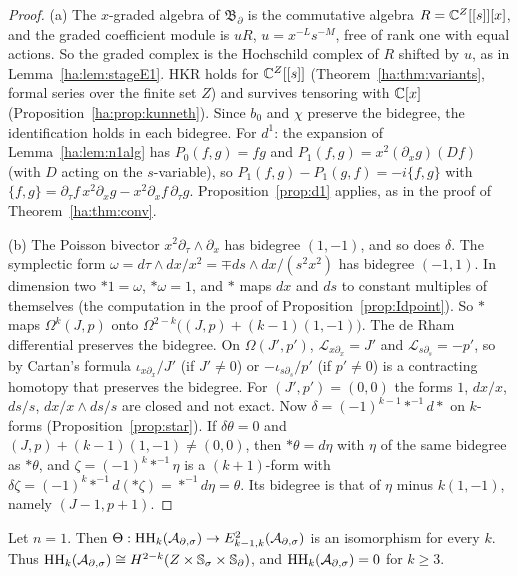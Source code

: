 \begin{proof}
(a) The \(x\)-graded algebra of \(\mathfrak B_\partial\) is the commutative
algebra \(R=\mathbb C^Z[[s]][x]\), and the graded coefficient module is \(uR\),
\(u=x^{-L}s^{-M}\), free of rank one with equal actions. So the graded
complex is the Hochschild complex of \(R\) shifted by \(u\), as in
Lemma~\ref{ha:lem:stageE1}. HKR holds for \(\mathbb C^Z[[s]]\)
(Theorem~\ref{ha:thm:variants}, formal series over the finite set \(Z\))
and survives tensoring with \(\mathbb C[x]\) (Proposition~\ref{ha:prop:kunneth}).
Since \(b_0\) and \(\chi\) preserve the bidegree, the identification holds
in each bidegree. For \(d^1\): the expansion of Lemma~\ref{ha:lem:n1alg}
has \(P_0(f,g)=fg\) and \(P_1(f,g)=x^2(\partial_xg)(Df)\) (with \(D\)
acting on the \(s\)-variable), so \(P_1(f,g)-P_1(g,f)=-i\{f,g\}\) with
\(\{f,g\}=\partial_\tau f\,x^2\partial_xg-x^2\partial_xf\,\partial_\tau g\).
Proposition~\ref{prop:d1} applies, as in the proof of
Theorem~\ref{ha:thm:conv}.

(b) The Poisson bivector \(x^2\partial_\tau\wedge\partial_x\) has
bidegree \((1,-1)\), and so does \(\delta\). The symplectic form
\(\omega=d\tau\wedge dx/x^2=\mp ds\wedge dx/(s^2x^2)\) has bidegree
\((-1,1)\). In dimension two \(*1=\omega\), \(*\omega=1\), and \(*\) maps
\(dx\) and \(ds\) to constant multiples of themselves (the computation in
the proof of Proposition~\ref{prop:Idpoint}). So \(*\) maps
\(\Omega^k(J,p)\) onto \(\Omega^{2-k}\bigl((J,p)+(k-1)(1,-1)\bigr)\). The de
Rham differential preserves the bidegree. On \(\Omega(J',p')\),
\(\mathcal L_{x\partial_x}=J'\) and \(\mathcal L_{s\partial_s}=-p'\), so by
Cartan's formula \(\iota_{x\partial_x}/J'\) (if \(J'\ne0\)) or
\(-\iota_{s\partial_s}/p'\) (if \(p'\ne0\)) is a contracting homotopy
that preserves the bidegree. For \((J',p')=(0,0)\) the forms \(1\),
\(dx/x\), \(ds/s\), \(dx/x\wedge ds/s\) are closed and not exact. Now
\(\delta=(-1)^{k-1}*^{-1}d*\) on \(k\)-forms (Proposition~\ref{prop:star}).
If \(\delta\theta=0\) and \((J,p)+(k-1)(1,-1)\ne(0,0)\), then
\(*\theta=d\eta\) with \(\eta\) of the same bidegree as \(*\theta\),
and \(\zeta=(-1)^k*^{-1}\eta\) is a \((k+1)\)-form with
\(\delta\zeta=(-1)^k*^{-1}d(*\zeta)=*^{-1}d\eta=\theta\). Its bidegree is that of \(\eta\) minus
\(k(1,-1)\), namely \((J-1,p+1)\).
\end{proof}

\begin{proposition}[Convergence for \(n=1\)]\label{ha:prop:xadic}
Let \(n=1\). Then \(\Theta:\operatorname{HH}_k(\mathcal A_{\partial,\sigma})\to E^2_{k-1,k}(\mathcal A_{\partial,\sigma})\) is an
isomorphism for every \(k\). Thus \(\operatorname{HH}_k(\mathcal A_{\partial,\sigma})\cong
H^{2-k}(Z\times\mathbb S_\sigma\times\mathbb S_\partial)\), and \(\operatorname{HH}_k(\mathcal A_{\partial,\sigma})=0\) for \(k\ge3\).
\end{proposition}

